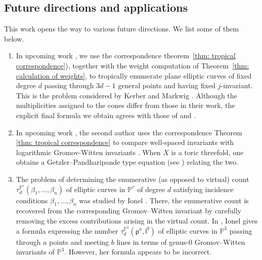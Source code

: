 \documentclass{article}
\begin{document}
\subsection{Future directions and applications}

This work opens the way to various future directions. We list some of them below.
\begin{enumerate}
    \item[$\bullet$] In upcoming work \cite{CKUpcoming}, we use the correspondence theorem~\ref{thm: tropical correspondence}), together with the weight computation of Theorem~\ref{thm: calculation of weights}, to tropically enumerate plane elliptic curves of fixed degree $d$ passing through $3d-1$ general points and having fixed $j$-invariant. This is the problem considered by Kerber and Markwig \cite{KM09}. Although the multiplicities assigned to the cones differ from those in their work, the explicit final formula we obtain agrees with those of \cite{KM09} and \cite{Pandh97}.
    \item[$\bullet$] In upcoming work \cite{KUpcoming}, the second author uses the correspondence Theorem \ref{thm: tropical correspondence} to compare well-spaced invariants with logarithmic Gromov-Witten invariants \cite{GS2013}. When $X$ is a toric threefold, one obtains a Getzler--Pandharipande type equation (see \cite[Theorem 6.1]{Ge97}) relating the two. 
    \item[$\bullet$] The problem of determining the enumerative (as opposed to virtual) count $\tau_d^{\mathbb{P}^r}(\beta_1,\ldots,\beta_n)$ of elliptic curves in $\mathbb{P}^r$ of degree $d$ satisfying incidence conditions $\beta_1,\ldots,\beta_n$ was studied by Ionel \cite{Ionel}. There, the enumerative count is recovered from the corresponding Gromov--Witten invariant by carefully removing the excess contributions arising in the virtual count. In \cite[Proposition 0.2]{Ionel}, Ionel gives a formula expressing the number $\tau_d^{\mathbb{P}^3}(\mathsf{p}^a,\mathsf{l}^b)$ of elliptic curves in $\mathbb{P}^3$ passing through $a$ points and meeting $b$ lines in terms of genus-$0$ Gromov--Witten invariants of $\mathbb{P}^3$. However, her formula appears to be incorrect.


\end{enumerate}
\end{document}
